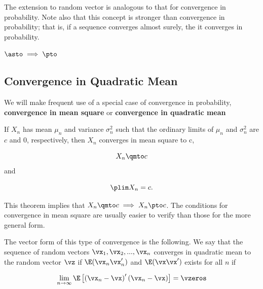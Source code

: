 \documentclass[english,12pt]{book}\usepackage[]{graphicx}\usepackage[]{xcolor}
\begin{document}
The extension to random vector is analogous to that for convergence in probability. Note also that this concept is stronger than convergence in probability; that is, if a sequence converges almost surely, the it converges in probability. 

\begin{remark}
  $\asto \implies \pto$
\end{remark}



\subsection{Convergence in Quadratic Mean}

We will make frequent use of a special case of convergence in probability, \textbf{convergence in mean square} or \textbf{convergence in quadratic mean}

\begin{theorem}\label{teo:conv_qm}
If $X_n$ has mean $\mu_n$ and variance $\sigma^2_n$ such that the ordinary limits of $\mu_n$ and $\sigma^2_n$ are $c$ and 0, respectively, then $X_n$ converges in mean square to c,

\begin{equation*}
  X_n\qmto c
\end{equation*}
%
and 

\begin{equation*}
  \plim X_n = c.
\end{equation*}
\end{theorem}

This theorem implies that $X_n\qmto c \implies X_n\pto c$. The conditions for convergence in mean square are usually easier to verify than those for the more general form.

The vector form of this type of convergence is the following. We say that the sequence of random vectors $\vx_1, \vx_2,...,\vx_n$ converges in quadratic mean to the random vector $\vz$ if $\E(\vx_n\vx_n')$ and $\E(\vx\vx')$ exists for all $n$ if

\begin{equation*}
  \lim_{n\to \infty} \E\left[\left(\vx_n  - \vx\right)'\left(\vx_n  - \vx\right)\right] = \vzeros
\end{equation*}
\end{document}
